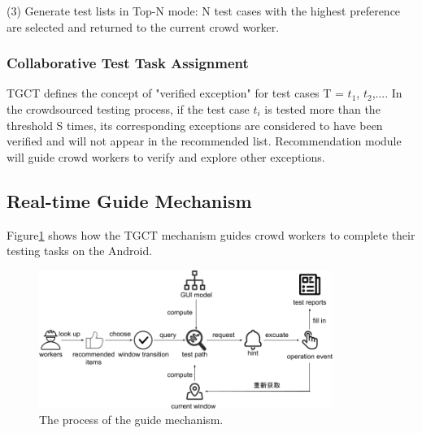 (3) Generate test lists in Top-N mode: N test cases with the highest preference are selected and returned to the current crowd worker.%

\subsubsection{Collaborative Test Task Assignment}
TGCT defines the concept of "verified exception" for test cases T = {$t_{1}$, $t_{2}$,...}. In the crowdsourced testing process, if the test case $t_{i}$ is tested more than the threshold S times, its corresponding exceptions are considered to have been verified and will not appear in the recommended list. Recommendation module will guide crowd workers to verify and explore other exceptions.%

\subsection{Real-time Guide Mechanism}
Figure\ref{fig:guide} shows how the TGCT mechanism guides crowd workers to complete their testing tasks on the Android.
\begin{figure}[htbp]
\centering
\centerline{\includegraphics[width=\columnwidth,height=4.5cm]{fig/10.png}}
\caption{The process of the guide mechanism.}
\label{fig:guide}
\end{figure}



